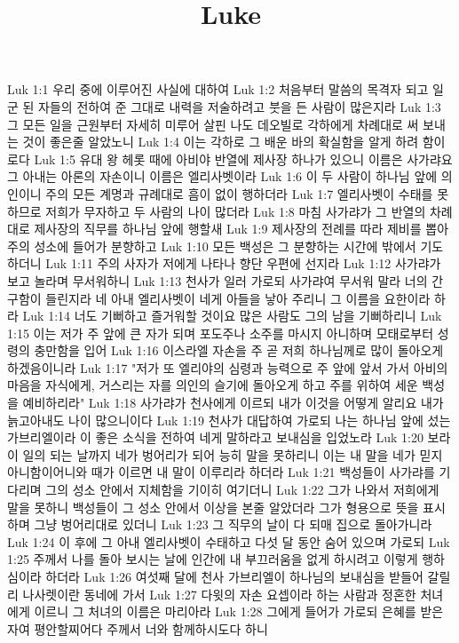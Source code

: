

\title{Luke}

Luk 1:1  우리 중에 이루어진 사실에 대하여
Luk 1:2  처음부터 말씀의 목격자 되고 일군 된 자들의 전하여 준 그대로 내력을 저술하려고 붓을 든 사람이 많은지라
Luk 1:3  그 모든 일을 근원부터 자세히 미루어 살핀 나도 데오빌로 각하에게 차례대로 써 보내는 것이 좋은줄 알았노니
Luk 1:4  이는 각하로 그 배운 바의 확실함을 알게 하려 함이로다
Luk 1:5  유대 왕 헤롯 때에 아비야 반열에 제사장 하나가 있으니 이름은 사가랴요 그 아내는 아론의 자손이니 이름은 엘리사벳이라
Luk 1:6  이 두 사람이 하나님 앞에 의인이니 주의 모든 계명과 규례대로 흠이 없이 행하더라
Luk 1:7  엘리사벳이 수태를 못하므로 저희가 무자하고 두 사람의 나이 많더라
Luk 1:8  마침 사가랴가 그 반열의 차례대로 제사장의 직무를 하나님 앞에 행할새
Luk 1:9  제사장의 전례를 따라 제비를 뽑아 주의 성소에 들어가 분향하고
Luk 1:10  모든 백성은 그 분향하는 시간에 밖에서 기도하더니
Luk 1:11  주의 사자가 저에게 나타나 향단 우편에 선지라
Luk 1:12  사가랴가 보고 놀라며 무서워하니
Luk 1:13  천사가 일러 가로되 사가랴여 무서워 말라 너의 간구함이 들린지라 네 아내 엘리사벳이 네게 아들을 낳아 주리니 그 이름을 요한이라 하라
Luk 1:14  너도 기뻐하고 즐거워할 것이요 많은 사람도 그의 남을 기뻐하리니
Luk 1:15  이는 저가 주 앞에 큰 자가 되며 포도주나 소주를 마시지 아니하며 모태로부터 성령의 충만함을 입어
Luk 1:16  이스라엘 자손을 주 곧 저희 하나님께로 많이 돌아오게 하겠음이니라
Luk 1:17  "저가 또 엘리야의 심령과 능력으로 주 앞에 앞서 가서 아비의 마음을 자식에게, 거스리는 자를 의인의 슬기에 돌아오게 하고 주를 위하여 세운 백성을 예비하리라"
Luk 1:18  사가랴가 천사에게 이르되 내가 이것을 어떻게 알리요 내가 늙고아내도 나이 많으니이다
Luk 1:19  천사가 대답하여 가로되 나는 하나님 앞에 섰는 가브리엘이라 이 좋은 소식을 전하여 네게 말하라고 보내심을 입었노라
Luk 1:20  보라 이 일의 되는 날까지 네가 벙어리가 되어 능히 말을 못하리니 이는 내 말을 네가 믿지 아니함이어니와 때가 이르면 내 말이 이루리라 하더라
Luk 1:21  백성들이 사가랴를 기다리며 그의 성소 안에서 지체함을 기이히 여기더니
Luk 1:22  그가 나와서 저희에게 말을 못하니 백성들이 그 성소 안에서 이상을 본줄 알았더라 그가 형용으로 뜻을 표시하며 그냥 벙어리대로 있더니
Luk 1:23  그 직무의 날이 다 되매 집으로 돌아가니라
Luk 1:24  이 후에 그 아내 엘리사벳이 수태하고 다섯 달 동안 숨어 있으며 가로되
Luk 1:25  주께서 나를 돌아 보시는 날에 인간에 내 부끄러움을 없게 하시려고 이렇게 행하심이라 하더라
Luk 1:26  여섯째 달에 천사 가브리엘이 하나님의 보내심을 받들어 갈릴리 나사렛이란 동네에 가서
Luk 1:27  다윗의 자손 요셉이라 하는 사람과 정혼한 처녀에게 이르니 그 처녀의 이름은 마리아라
Luk 1:28  그에게 들어가 가로되 은혜를 받은 자여 평안할찌어다 주께서 너와 함께하시도다 하니
